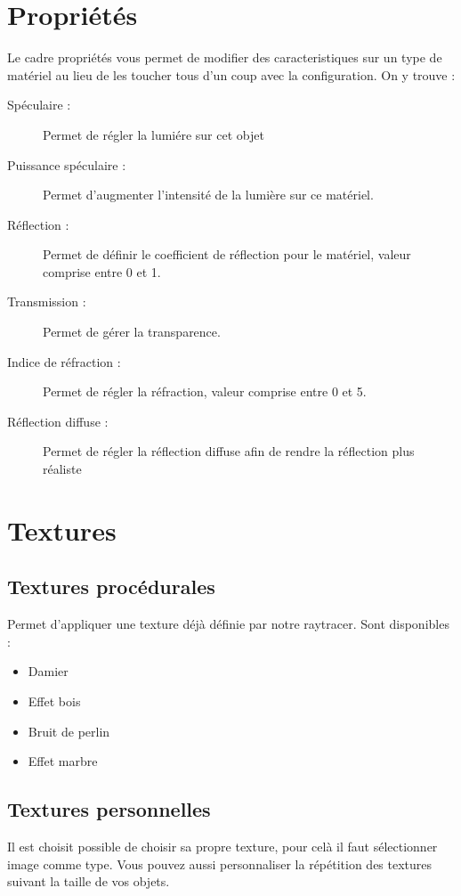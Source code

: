 \documentclass{report}
\begin{document}
\chapter{Propri\'et\'es}
Le cadre propri\'et\'es vous permet de modifier des caracteristiques sur un type de mat\'eriel au lieu de les toucher tous d'un coup avec la configuration.
\newline On y trouve :
\begin{description}
 \item[Sp\'eculaire :] Permet de r\'egler la lumi\'ere sur cet objet
 \item[Puissance sp\'eculaire :] Permet d'augmenter l'intensit\'e de la lumi\`ere sur ce mat\'eriel.
 \item[R\'eflection :] Permet de d\'efinir le coefficient de r\'eflection pour le mat\'eriel, valeur comprise entre 0 et 1.
 \item[Transmission :] Permet de g\'erer la transparence. 
 \item[Indice de r\'efraction :] Permet de r\'egler la r\'efraction, valeur comprise entre 0 et 5.
 \item[R\'eflection diffuse :] Permet de r\'egler la r\'eflection diffuse afin de rendre la r\'eflection plus r\'ealiste
\end{description}
\chapter{Textures}
\section{Textures proc\'edurales}
Permet d'appliquer une texture d\'ej\`a d\'efinie par notre raytracer.
\newline Sont disponibles :
\begin{itemize}
 \item Damier
 \item Effet bois
 \item Bruit de perlin
 \item Effet marbre
\end{itemize}
\section{Textures personnelles}
Il est choisit possible de choisir sa propre texture, pour cel\`a il faut s\'electionner image comme type.
\newline Vous pouvez aussi personnaliser la r\'ep\'etition des textures suivant la taille de vos objets.
\end{document}
